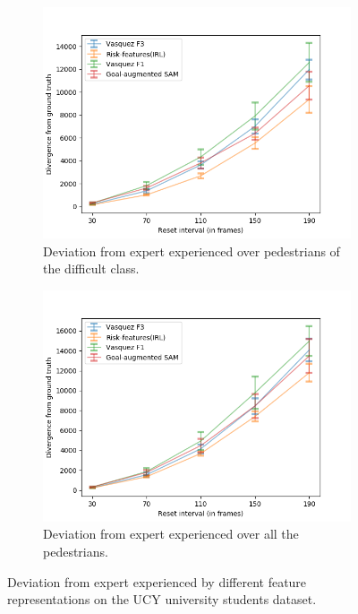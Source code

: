 \begin{figure}[htbp]
\begin{subfigure}{0.5\textwidth}
		\label{fig:inter_IRL-drift_analysis_med}
	\end{subfigure}
	\begin{subfigure}{0.5\textwidth}
		\centering
		\includegraphics[width=\linewidth]{plots/plot_without_outliers/ucy_inter_irl_no_outliers/ucy_irl_hard.png}
		\caption {Deviation from expert experienced over pedestrians of the difficult class.}
		\label{fig:inter_IRL-drift_analysis_hard}
	\end{subfigure}
	\begin{subfigure}{0.5\textwidth}
		\centering
		\includegraphics[width=\linewidth]{plots/plot_without_outliers/ucy_inter_irl_no_outliers/ucy_irl_all.png}
		\caption {Deviation from expert experienced over all the pedestrians.}
		\label{fig:inter_IRL-drift_analysis_all}
	\end{subfigure}
	\caption{Deviation from expert experienced by different feature representations on the UCY university students dataset.}
\end{figure}


